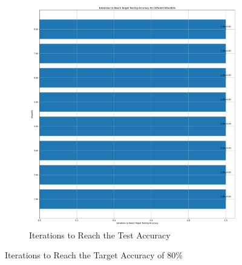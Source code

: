\begin{figure}[H]
\begin{subfigure}[H]{0.48\textwidth}
                \includegraphics[width=\textwidth]{../standard/MNIST/plots/mnist_test_iters.pdf}
                \caption{Iterations to Reach the Test Accuracy}
            \end{subfigure}
            \caption{Iterations to Reach the Target Accuracy of 80\%}
        \end{figure}

